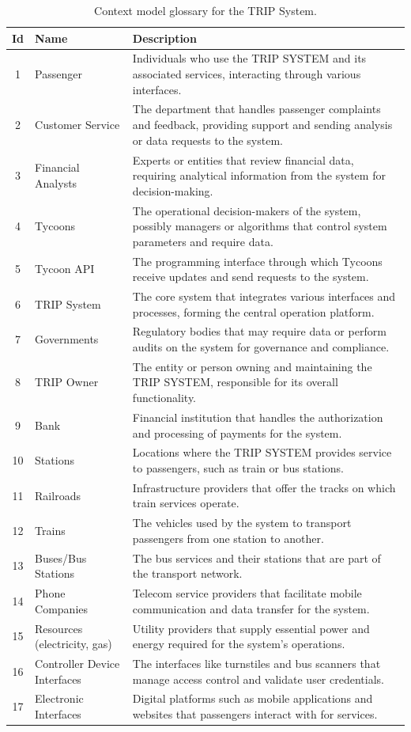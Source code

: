 \begin{table}[H]
\centering
\begin{tabular}{@{}clp{9cm}@{}}
\toprule
\textbf{Id} & \textbf{Name} & \textbf{Description} \\
\midrule
1 & Passenger & Individuals who use the TRIP SYSTEM and its associated services, interacting through various interfaces. \\
2 & Customer Service & The department that handles passenger complaints and feedback, providing support and sending analysis or data requests to the system. \\
3 & Financial Analysts & Experts or entities that review financial data, requiring analytical information from the system for decision-making. \\
4 & Tycoons & The operational decision-makers of the system, possibly managers or algorithms that control system parameters and require data. \\
5 & Tycoon API & The programming interface through which Tycoons receive updates and send requests to the system. \\
6 & TRIP System & The core system that integrates various interfaces and processes, forming the central operation platform. \\
7 & Governments & Regulatory bodies that may require data or perform audits on the system for governance and compliance. \\
8 & TRIP Owner & The entity or person owning and maintaining the TRIP SYSTEM, responsible for its overall functionality. \\
9 & Bank & Financial institution that handles the authorization and processing of payments for the system. \\
10 & Stations & Locations where the TRIP SYSTEM provides service to passengers, such as train or bus stations. \\
11 & Railroads & Infrastructure providers that offer the tracks on which train services operate. \\
12 & Trains & The vehicles used by the system to transport passengers from one station to another. \\
13 & Buses/Bus Stations & The bus services and their stations that are part of the transport network. \\
14 & Phone Companies & Telecom service providers that facilitate mobile communication and data transfer for the system. \\
15 & Resources (electricity, gas) & Utility providers that supply essential power and energy required for the system’s operations. \\
16 & Controller Device Interfaces & The interfaces like turnstiles and bus scanners that manage access control and validate user credentials. \\
17 & Electronic Interfaces & Digital platforms such as mobile applications and websites that passengers interact with for services. \\
\bottomrule
\end{tabular}
\caption{Context model glossary for the TRIP System.}
\label{tab:glossary_context_view}
\end{table}


